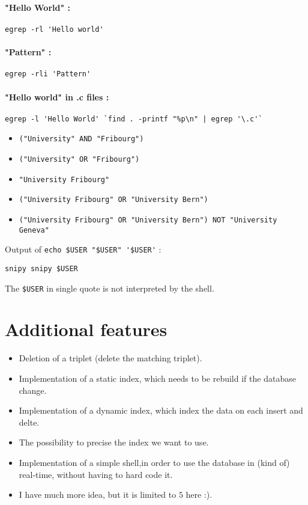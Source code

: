 \documentclass[a4paper,11pt]{report}
\begin{document}
\paragraph{"Hello World" : } \verb+egrep -rl 'Hello world'+

\paragraph{"Pattern" : } \verb+egrep -rli 'Pattern'+

\paragraph{"Hello world" in .c files :} \verb+egrep -l 'Hello World' `find . -printf "%p\n" | egrep '\.c'`+

\begin{itemize}
\item \verb+("University" AND "Fribourg")+
\item \verb+("University" OR "Fribourg")+
\item \verb+"University Fribourg"+
\item \verb+("University Fribourg" OR "University Bern")+
\item \verb+("University Fribourg" OR "University Bern") NOT "University Geneva"+
\end{itemize}


Output of \verb+echo $USER "$USER" '$USER'+ :

\begin{verbatim}
snipy snipy $USER
\end{verbatim}

The \verb+$USER+ in single quote is not interpreted by the shell.


\section*{Additional features}

\begin{itemize}
\item Deletion of a triplet (delete the matching triplet).
\item Implementation of a static index, which needs to be rebuild if the database change.
\item Implementation of a dynamic index, which index the data on each insert and delte.
\item The possibility to precise the index we want to use.
\item Implementation of a simple shell,in order to use the database in (kind of)
  real-time, without having to hard code it.
\item I have much more idea, but it is limited to $5$ here :).
\end{itemize}
\end{document}
